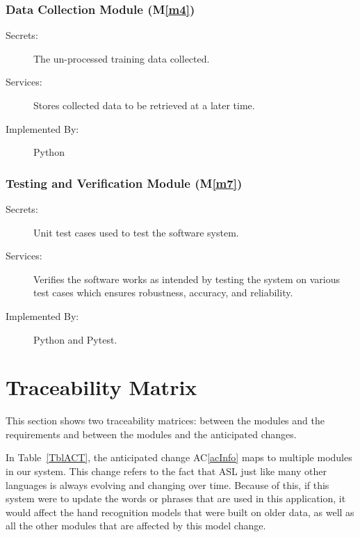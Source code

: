 \documentclass[12pt, titlepage]{article}
\newcommand{\acref}[1]{AC\ref{#1}}
\newcommand{\mref}[1]{M\ref{#1}}
\begin{document}
\subsubsection{Data Collection Module (\mref{m4})}

\begin{description}
\item[Secrets:] The un-processed training data collected.
\item[Services:] Stores collected data to be retrieved at a later time.
\item[Implemented By:] Python
\end{description}

\subsubsection{Testing and Verification Module (\mref{m7})}
\begin{description}
\item[Secrets:] Unit test cases used to test the software system.
\item[Services:] Verifies the software works as intended by testing the system on various test cases which ensures robustness, accuracy, and reliability.
\item[Implemented By:] Python and Pytest.
\end{description}

\section{Traceability Matrix} \label{SecTM}

This section shows two traceability matrices: between the modules and the
requirements and between the modules and the anticipated changes. 

In Table~\ref{TblACT}, the anticipated change \acref{acInfo} maps to multiple modules in our system. This change refers to the fact that ASL just like
many other languages is always evolving and changing over time. Because of this, if this system were to update the words or phrases that are used in
this application, it would affect the hand recognition models that were built on older data, as well as all the other modules that are affected by this model change. 
\end{document}
